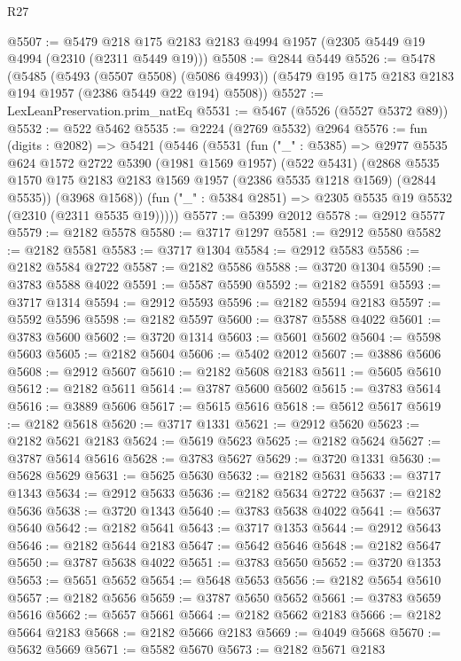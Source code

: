\begin{lexlean}{R27}
\begin{coremodule}
@5507 := @5479 @218 @175 @2183 @2183 @4994 @1957 (@2305 @5449 @19 @4994 (@2310 (@2311 @5449 @19)))
@5508 := @2844 @5449
@5526 := @5478
    (@5485
      (@5493 (@5507 @5508) (@5086 @4993))
      (@5479 @195 @175 @2183 @2183 @194 @1957 (@2386 @5449 @22 @194) @5508))
@5527 := LexLeanPreservation.prim_natEq
@5531 := @5467 (@5526 (@5527 @5372 @89))
@5532 := @522 @5462
@5535 := @2224 (@2769 @5532) @2964
@5576 := fun (digits : @2082) =>
  @5421
    (@5446
      (@5531
        (fun ("_" : @5385) =>
        @2977
          @5535
          @624
          @1572
          @2722
          @5390
          (@1981 @1569 @1957)
          (@522 @5431)
          (@2868 @5535 @1570 @175 @2183 @2183 @1569 @1957 (@2386 @5535 @1218 @1569) (@2844 @5535))
          (@3968 @1568))
        (fun ("_" : @5384 @2851) => @2305 @5535 @19 @5532 (@2310 (@2311 @5535 @19)))))
@5577 := @5399 @2012
@5578 := @2912 @5577
@5579 := @2182 @5578
@5580 := @3717 @1297
@5581 := @2912 @5580
@5582 := @2182 @5581
@5583 := @3717 @1304
@5584 := @2912 @5583
@5586 := @2182 @5584 @2722
@5587 := @2182 @5586
@5588 := @3720 @1304
@5590 := @3783 @5588 @4022
@5591 := @5587 @5590
@5592 := @2182 @5591
@5593 := @3717 @1314
@5594 := @2912 @5593
@5596 := @2182 @5594 @2183
@5597 := @5592 @5596
@5598 := @2182 @5597
@5600 := @3787 @5588 @4022
@5601 := @3783 @5600
@5602 := @3720 @1314
@5603 := @5601 @5602
@5604 := @5598 @5603
@5605 := @2182 @5604
@5606 := @5402 @2012
@5607 := @3886 @5606
@5608 := @2912 @5607
@5610 := @2182 @5608 @2183
@5611 := @5605 @5610
@5612 := @2182 @5611
@5614 := @3787 @5600 @5602
@5615 := @3783 @5614
@5616 := @3889 @5606
@5617 := @5615 @5616
@5618 := @5612 @5617
@5619 := @2182 @5618
@5620 := @3717 @1331
@5621 := @2912 @5620
@5623 := @2182 @5621 @2183
@5624 := @5619 @5623
@5625 := @2182 @5624
@5627 := @3787 @5614 @5616
@5628 := @3783 @5627
@5629 := @3720 @1331
@5630 := @5628 @5629
@5631 := @5625 @5630
@5632 := @2182 @5631
@5633 := @3717 @1343
@5634 := @2912 @5633
@5636 := @2182 @5634 @2722
@5637 := @2182 @5636
@5638 := @3720 @1343
@5640 := @3783 @5638 @4022
@5641 := @5637 @5640
@5642 := @2182 @5641
@5643 := @3717 @1353
@5644 := @2912 @5643
@5646 := @2182 @5644 @2183
@5647 := @5642 @5646
@5648 := @2182 @5647
@5650 := @3787 @5638 @4022
@5651 := @3783 @5650
@5652 := @3720 @1353
@5653 := @5651 @5652
@5654 := @5648 @5653
@5656 := @2182 @5654 @5610
@5657 := @2182 @5656
@5659 := @3787 @5650 @5652
@5661 := @3783 @5659 @5616
@5662 := @5657 @5661
@5664 := @2182 @5662 @2183
@5666 := @2182 @5664 @2183
@5668 := @2182 @5666 @2183
@5669 := @4049 @5668
@5670 := @5632 @5669
@5671 := @5582 @5670
@5673 := @2182 @5671 @2183

\end{coremodule}
\end{lexlean}
